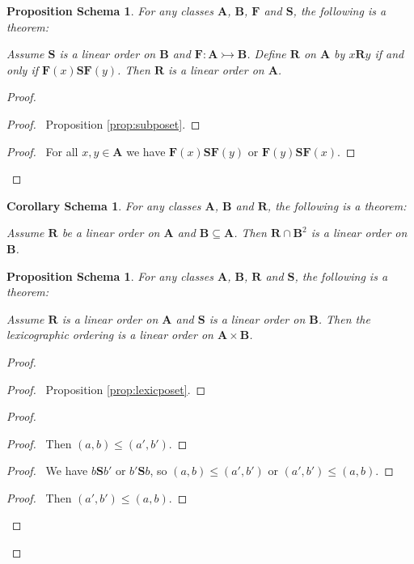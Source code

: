 \documentclass{book}
\let\qed\relax
\newtheorem{props}[ax]{Proposition Schema}
\newtheorem{cors}{Corollary Schema}[ax]
\theoremstyle{definition}
\begin{document}
\begin{props}
\label{prop:subloset}
For any classes $\mathbf{A}$, $\mathbf{B}$, $\mathbf{F}$ and $\mathbf{S}$, the following is a theorem:

Assume $\mathbf{S}$ is a linear order on $\mathbf{B}$ and $\mathbf{F} : \mathbf{A} \rightarrowtail \mathbf{B}$. Define $\mathbf{R}$ on $\mathbf{A}$ by $x \mathbf{R} y$ if and only if $\mathbf{F}(x) \mathbf{S} \mathbf{F}(y)$. Then $\mathbf{R}$ is a linear order on $\mathbf{A}$.
\end{props}

\begin{proof}
\pf
{}
\begin{proof}
	\pf\ Proposition \ref{prop:subposet}.
\end{proof}
\begin{proof}
	\pf\ For all $x,y \in \mathbf{A}$ we have $\mathbf{F}(x) \mathbf{S} \mathbf{F}(y)$ or $\mathbf{F}(y) \mathbf{S} \mathbf{F}(x)$.
\end{proof}
\qed
\end{proof}

\begin{cors}
For any classes $\mathbf{A}$, $\mathbf{B}$ and $\mathbf{R}$, the following is a theorem:

Assume $\mathbf{R}$ be a linear order on $\mathbf{A}$ and $\mathbf{B} \subseteq \mathbf{A}$. Then $\mathbf{R} \cap \mathbf{B}^2$ is a linear order on $\mathbf{B}$.
\end{cors}

\begin{props}
For any classes $\mathbf{A}$, $\mathbf{B}$, $\mathbf{R}$ and $\mathbf{S}$, the following is a theorem:

Assume $\mathbf{R}$ is a linear order on $\mathbf{A}$ and $\mathbf{S}$ is a linear order on $\mathbf{B}$. Then the lexicographic ordering is a linear order on $\mathbf{A} \times \mathbf{B}$.
\end{props}

\begin{proof}
\pf
{}
\begin{proof}
	\pf\ Proposition \ref{prop:lexicposet}.
\end{proof}
\begin{proof}
	\begin{proof}
		\pf\ Then $(a,b) \leq (a',b')$.
	\end{proof}
	\begin{proof}
		\pf\ We have $b \mathbf{S} b'$ or $b' \mathbf{S} b$, so $(a,b) \leq (a',b')$ or $(a',b') \leq (a,b)$.
	\end{proof}
	\begin{proof}
		\pf\ Then $(a',b') \leq (a,b)$.
	\end{proof}
\end{proof}
\qed
\end{proof}
\end{document}

